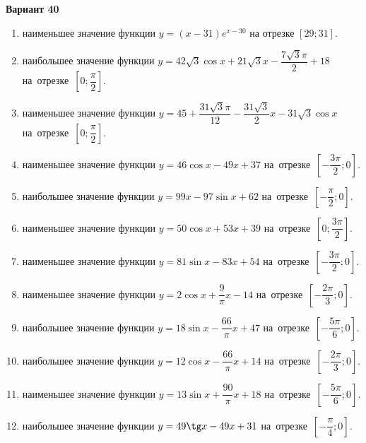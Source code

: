 \documentclass[a4paper,10pt]{article}
\begin{document}
\begin{center}\Large\textbf{Вариант 40}\end{center}

\begin{enumerate}
\item {} наименьшее значение функции $y = \left(x-31\right)e^{x-30}$ на отрезке $\left[29;31\right]$.

\item {} наибольшее значение функции $y = 42\sqrt{3}\cos x+21\sqrt{3}x-\dfrac{7\sqrt{3}\pi}{2} +18$ на~отрезке~$\left[0;\dfrac{\pi }{2}\right]$.

\item {} наименьшее значение функции $y = 45+\dfrac{31\sqrt{3} \pi}{12}-\dfrac{31\sqrt{3}}{2}x-31\sqrt{3}\cos x$ на~отрезке~$\left[0;\dfrac{\pi }{2}\right]$.

\item {} наименьшее значение функции $y = 46\cos x-49x+37$ на~отрезке~$\left[-\dfrac{3\pi }{2};0\right]$.

\item {} наибольшее значение функции $y = 99x-97\sin x+62$ на~отрезке~$\left[-\dfrac{\pi }{2};0\right]$.

\item {} наименьшее значение функции $y = 50\cos x+53x+39$ на~отрезке~$\left[0;\dfrac{3\pi }{2}\right]$.

\item {} наименьшее значение функции $y = 81\sin x-83x+54$ на~отрезке~$\left[-\dfrac{3\pi }{2};0\right]$.

\item {} наименьшее значение функции $y = 2\cos x+\dfrac{9}{\pi }x -14$ на~отрезке~$\left[-\dfrac{2\pi }{3};0\right]$.

\item {} наибольшее значение функции $y = 18\sin x-\dfrac{66}{\pi }x+47$ на~отрезке~$\left[-\dfrac{5\pi }{6};0\right]$.

\item {} наибольшее значение функции $y = 12\cos x-\dfrac{66}{\pi }x+14$ на~отрезке~$\left[-\dfrac{2\pi }{3};0\right]$.

\item {} наименьшее значение функции $y = 13\sin x+\dfrac{90}{\pi }x+18$ на~отрезке~$\left[-\dfrac{5\pi }{6};0\right]$.

\item {} наибольшее значение функции $y = 49\tg x-49x+31$ на~отрезке~$\left[-\dfrac{\pi }{4};0\right]$.


\end{enumerate}
\end{document}
